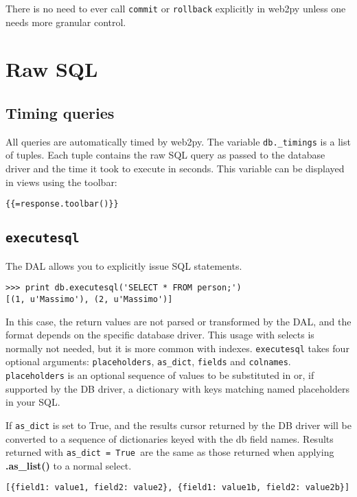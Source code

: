 \documentclass[justified,sixbynine,notoc]{tufte-book}
\def\ft{\small\tt}
\def\inxx#1{\index{#1}}
\begin{document}
\begin{fullwidth}
There is no need to ever call {\ft commit}  or {\ft rollback} explicitly in web2py unless one needs more granular control.

\goodbreak\section{Raw SQL}

\goodbreak\subsection{Timing queries}

All queries are automatically timed by web2py. The variable {\ft db.\_timings} is a list of tuples. Each tuple contains the raw SQL query as passed to the database driver and the time it took to execute in seconds. This variable can be displayed in views using the toolbar:

\begin{lstlisting}[keywords={}]
{{=response.toolbar()}}
\end{lstlisting}

\goodbreak\subsection{{\ft executesql}}

The DAL allows you to explicitly issue SQL statements.

\inxx{executesql}
\begin{lstlisting}
>>> print db.executesql('SELECT * FROM person;')
[(1, u'Massimo'), (2, u'Massimo')]
\end{lstlisting}

In this case, the return values are not parsed or transformed by the DAL, and the format depends on the specific database driver. This usage with selects is normally not needed, but it is more common with indexes.
{\ft executesql} takes four optional arguments: {\ft placeholders}, {\ft as\_dict}, {\ft fields} and {\ft colnames}.
{\ft placeholders} is an optional
sequence of values to be substituted in
or, if supported by the DB driver, a dictionary with keys
matching named placeholders in your SQL.

If {\ft as\_dict} is set to True,
and the results cursor returned by the DB driver will be
converted to a sequence of dictionaries keyed with the db
field names.  Results returned with {\ft as\_dict = True }are
the same as those returned when applying {\bf.as\_list()} to a normal select.
\begin{lstlisting}
[{field1: value1, field2: value2}, {field1: value1b, field2: value2b}]
\end{lstlisting}


\end{fullwidth}
\end{document}
